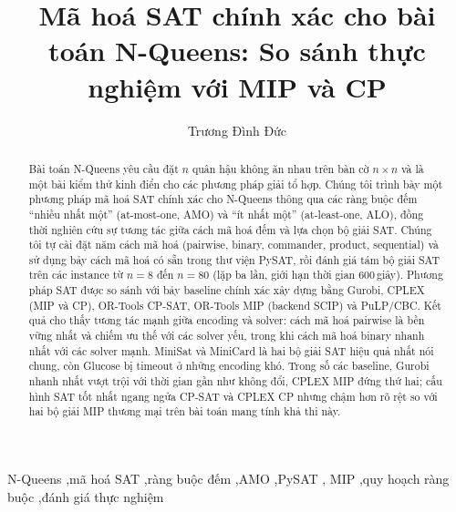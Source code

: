 \documentclass[a4paper,fleqn]{cas-sc}
\begin{document}
\let\WriteBookmarks\relax
\def\floatpagepagefraction{1}
\def\textpagefraction{.001}

\title[mode=title]{Mã hoá SAT chính xác cho bài toán N-Queens:\newline
So sánh thực nghiệm với MIP và CP}

\author[1]{Trương Đình Đức}


\begin{abstract}
Bài toán N-Queens yêu cầu đặt $n$ quân hậu không ăn nhau trên bàn cờ $n\times n$
và là một bài kiểm thử kinh điển cho các phương pháp giải tổ hợp. Chúng tôi trình
bày một phương pháp mã hoá SAT chính xác cho N-Queens thông qua các ràng buộc
đếm ``nhiều nhất một'' (at-most-one, AMO) và ``ít nhất một'' (at-least-one,
ALO), đồng thời nghiên cứu sự tương tác giữa cách mã hoá đếm và lựa chọn bộ giải
SAT. Chúng tôi tự cài đặt năm cách mã hoá (pairwise, binary, commander, product,
sequential) và sử dụng bảy cách mã hoá có sẵn trong thư viện PySAT, rồi đánh giá
tám bộ giải SAT trên các instance từ $n=8$ đến $n=80$ (lặp ba lần, giới hạn thời
gian 600\,giây). Phương pháp SAT được so sánh với bảy baseline chính xác xây dựng
bằng Gurobi, CPLEX (MIP và CP), OR-Tools CP-SAT, OR-Tools MIP (backend SCIP) và
PuLP/CBC. Kết quả cho thấy tương tác mạnh giữa encoding và solver: cách mã hoá
pairwise là bền vững nhất và chiếm ưu thế với các solver yếu, trong khi cách mã
hoá binary nhanh nhất với các solver mạnh. MiniSat và MiniCard là hai bộ giải SAT
hiệu quả nhất nói chung, còn Glucose bị timeout ở những encoding khó. Trong số
các baseline, Gurobi nhanh nhất vượt trội với thời gian gần như không đổi, CPLEX
MIP đứng thứ hai; cấu hình SAT tốt nhất ngang ngửa CP-SAT và CPLEX CP nhưng chậm
hơn rõ rệt so với hai bộ giải MIP thương mại trên bài toán mang tính khả thi này.
\end{abstract}

\begin{keywords}
N-Queens \sep mã hoá SAT \sep ràng buộc đếm \sep AMO \sep PySAT \sep
MIP \sep quy hoạch ràng buộc \sep đánh giá thực nghiệm
\end{keywords}

\maketitle
\end{document}
